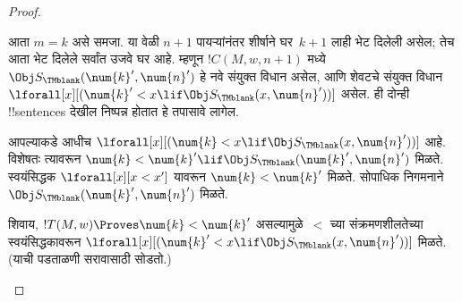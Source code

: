 \documentclass[../../../include/open-logic-section]{subfiles}
\begin{document}
\begin{proof}
\begin{enumerate}
आता $m=k$ असे समजा.
या वेळी $n+1$ पायऱ्यांनंतर
शीर्षाने घर~$k+1$ लाही
भेट दिलेली असेल; तेच
आता भेट दिलेले सर्वांत
उजवे घर आहे. म्हणून
$!C(M, w, n+1)$ मध्ये
$\Obj
S_\TMblank(\num{k}',\num{n}')$
हे नवे संयुक्त विधान असेल,
आणि शेवटचे संयुक्त विधान
$\lforall[x][(\num{k}' < x \lif \Obj S_\TMblank(x, \num{n}'))]$
असेल. ही दोन्ही !!{sentence}s
देखील निष्पन्न होतात
हे तपासावे लागेल.

आपल्याकडे आधीच
$\lforall[x][(\num{k} < x \lif \Obj S_\TMblank(x,
  \num{n}'))]$
आहे. विशेषतः त्यावरून
$\num{k} < \num{k}' \lif
\Obj S_\TMblank(\num{k}', \num{n}')$
मिळते. स्वयंसिद्धक
$\lforall[x][x <
  x']$ यावरून
$\num{k} < \num{k}'$
मिळते. सोपाधिक
निगमनाने
$\Obj
S_\TMblank(\num{k}',\num{n}')$
मिळते.

शिवाय,
$!T(M,w) \Proves \num{k} < \num{k}'$
असल्यामुळे~$<$ च्या
संक्रमणशीलतेच्या
स्वयंसिद्धकावरून
$\lforall[x][(\num{k}' < x \lif \Obj
  S_\TMblank(x, \num{n}'))]$
मिळते. (याची पडताळणी
सरावासाठी सोडतो.)


\end{enumerate}
\end{proof}
\end{document}
